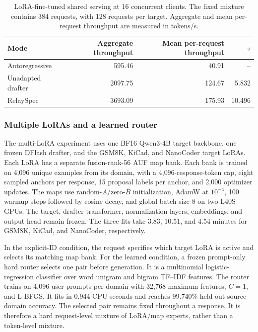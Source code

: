 \begin{table}[htbp]
\centering
\caption{LoRA-fine-tuned shared serving at 16 concurrent clients. The fixed mixture contains 384 requests, with 128 requests per target. Aggregate and mean per-request throughput are measured in tokens/s.}
\label{tab:lora-serving-16}
\small
\begin{tabular}{lrrr}
\toprule
Mode & Aggregate throughput & Mean per-request throughput & $\tau$ \\
\midrule
Autoregressive & 595.46 & 40.91 & -- \\
Unadapted drafter & 2097.75 & 124.67 & 5.832 \\
RelaySpec & 3693.09 & 175.93 & 10.496 \\
\bottomrule
\end{tabular}
\end{table}

\subsubsection{Multiple LoRAs and a learned router}

The multi-LoRA experiment uses one BF16 Qwen3-4B target backbone, one frozen DFlash drafter, and the GSM8K, KiCad, and NanoCoder target LoRAs.  Each LoRA has a separate fusion-rank-56 AUF map bank.  Each bank is trained on 4{,}096 unique examples from its domain, with a 4{,}096-response-token cap, eight sampled anchors per response, 15 proposal labels per anchor, and 2{,}000 optimizer updates.  The maps use random-$A$/zero-$B$ initialization, AdamW at $10^{-4}$, 100 warmup steps followed by cosine decay, and global batch size 8 on two L40S GPUs.  The target, drafter transformer, normalization layers, embeddings, and output head remain frozen.  The three fits take 3.83, 10.51, and 4.54 minutes for GSM8K, KiCad, and NanoCoder, respectively.

In the explicit-ID condition, the request specifies which target LoRA is active and selects its matching map bank.  For the learned condition, a frozen prompt-only hard router selects one pair before generation.  It is a multinomial logistic-regression classifier over word unigram and bigram TF--IDF features.  The router trains on 4{,}096 user prompts per domain with 32{,}768 maximum features, $C=1$, and L-BFGS.  It fits in 0.944 CPU seconds and reaches 99.740\% held-out source-domain accuracy.  The selected pair remains fixed throughout a response.  It is therefore a hard request-level mixture of LoRA/map experts, rather than a token-level mixture.

